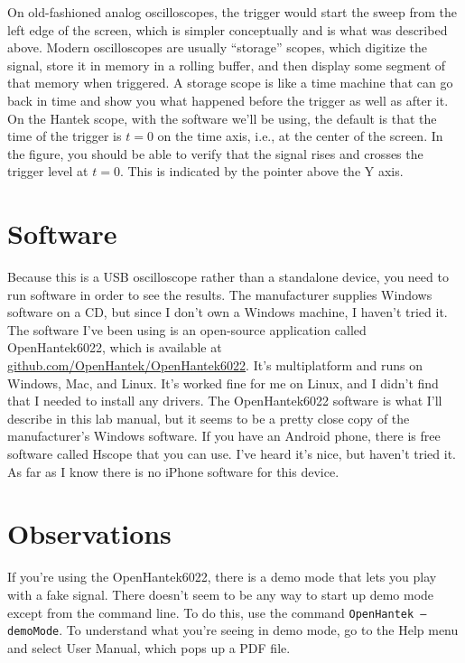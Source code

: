 On old-fashioned analog oscilloscopes, the trigger would start
the sweep from the left edge of the screen, which is simpler
conceptually and is what was described above. Modern oscilloscopes
are usually ``storage'' scopes, which digitize the signal,
store it in memory in a rolling buffer, and then display some
segment of that memory when triggered. A storage scope is
like a time machine that can go back in time and show you
what happened before the trigger as well as after it. On
the Hantek scope, with the software we'll be using, the default is
that the time of the trigger is $t=0$ on the time axis, i.e., at
the center of the screen. In the figure, you should be able to
verify that the signal rises and crosses the trigger level at $t=0$.
This is indicated by the pointer above the Y axis.

\section*{Software}

Because this is a USB oscilloscope rather than a standalone device,
you need to run software in order to see the results. The manufacturer
supplies Windows software on a CD, but since I don't own a Windows machine,
I haven't tried it. The software I've been using is an open-source application
called OpenHantek6022, which is available at \url{github.com/OpenHantek/OpenHantek6022}.
It's multiplatform and runs on Windows, Mac, and Linux. It's worked fine for me
on Linux, and I didn't find that I needed to install any drivers. The OpenHantek6022
software is what I'll describe in this lab manual, but it seems to be a pretty close
copy of the manufacturer's Windows software. If you have an Android phone, there is
free software called Hscope that you can use. I've heard it's nice, but haven't tried it.
As far as I know there is no iPhone software for this device.

\section*{Observations}


If you're using the OpenHantek6022, there is a demo mode that lets you play with
a fake signal. There doesn't seem to be any way to start up demo mode except from
the command line. To do this, use the command \texttt{OpenHantek --demoMode}.
To understand what you're seeing in demo mode, go to the Help menu and select
User Manual, which pops up a PDF file.

